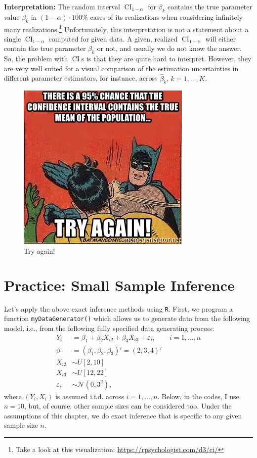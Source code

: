 \documentclass[
  letterpaper,
  DIV=11,
  numbers=noendperiod]{scrreprt}
\theoremstyle{definition}
\theoremstyle{plain}
\theoremstyle{plain}
\theoremstyle{remark}
\begin{document}
\textbf{Interpretation:} The random interval
\(\operatorname{CI}_{1-\alpha}\) for \(\beta_k\) contains the true
parameter value \(\beta_k\) in \((1-\alpha)\cdot 100\%\) cases of its
realizations when considering infinitely many realizations.\footnote{Take
  a look at this visualization: \url{https://rpsychologist.com/d3/ci/}}
Unfortunately, this interpretation is not a statement about a single
\(\operatorname{CI}_{1-\alpha}\) computed for given data. A given,
realized \(\operatorname{CI}_{1-\alpha}\) will either contain the true
parameter \(\beta_k\) or not, and usually we do not know the answer. So,
the problem with \(\operatorname{CI}\)s is that they are quite hard to
interpret. However, they are very well suited for a visual comparison of
the estimation uncertainties in different parameter estimators, for
instance, across \(\hat\beta_k\), \(k=1,\dots,K\).

\begin{figure}

{\centering \includegraphics{./images/Meme_CI.jpg}

}

\caption{Try again!}

\end{figure}

\hypertarget{sec-PSSI}{%
\section{Practice: Small Sample Inference}\label{sec-PSSI}}

Let's apply the above exact inference methods using \texttt{R}. First,
we program a function \texttt{myDataGenerator()} which allows us to
generate data from the following model, i.e., from the following fully
specified data generating process: \begin{align*}
Y_i &=\beta_1+\beta_2X_{i2}+\beta_3X_{i3}+\varepsilon_i,\qquad i=1,\dots,n\\
\beta &=(\beta_1,\beta_2,\beta_3)'=(2,3,4)'\\
X_{i2}&\sim U[2,10]\\
X_{i3}&\sim U[12,22]\\
\varepsilon_i&\sim\mathcal{N}(0,3^2),
\end{align*} where \((Y_i,X_i)\) is assumed i.i.d. across
\(i=1,\dots,n\). Below, in the codes, I use \(n=10\), but, of course,
other sample sizes can be considered too. Under the assumptions of this
chapter, we do exact inference that is specific to any given sample size
\(n\).
\end{document}
